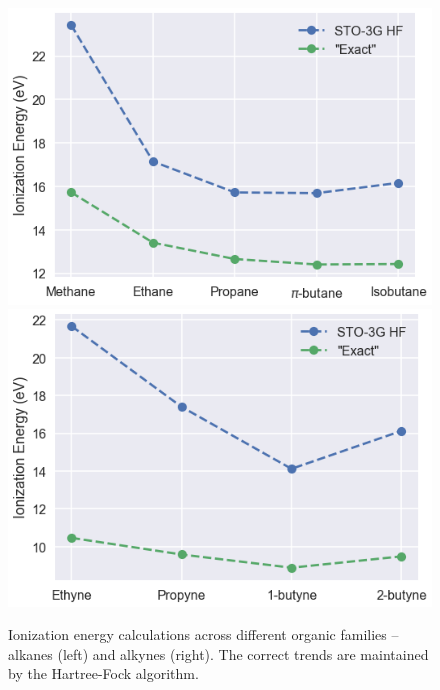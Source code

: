 \documentclass[12pt]{article}
\begin{document}
\begin{figure}[H]
\begin{center}
\includegraphics[scale=0.4]{img/alkanes}
\includegraphics[scale=0.4]{img/alkynes}
\end{center}
\caption{Ionization energy calculations across different organic families -- alkanes (left) and alkynes (right).  The correct trends are maintained by the Hartree-Fock algorithm.} \label{ionize-fams}
\end{figure} 
\end{document}
